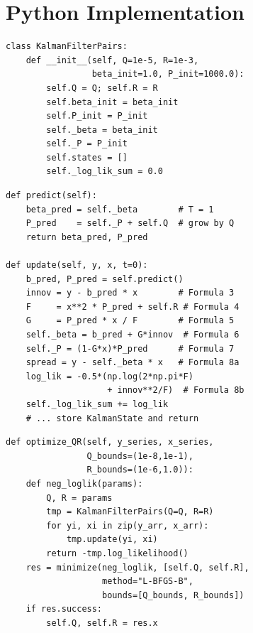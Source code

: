 \documentclass[10pt,a4paper,twocolumn]{article}
\begin{document}
\section{Python Implementation}

\begin{tcolorbox}[codebox={Constructor}]
\begin{lstlisting}[style=pythonplain]
class KalmanFilterPairs:
    def __init__(self, Q=1e-5, R=1e-3,
                 beta_init=1.0, P_init=1000.0):
        self.Q = Q; self.R = R
        self.beta_init = beta_init
        self.P_init = P_init
        self._beta = beta_init
        self._P = P_init
        self.states = []
        self._log_lik_sum = 0.0
\end{lstlisting}
\end{tcolorbox}

\begin{tcolorbox}[codebox={predict() and update()}]
\begin{lstlisting}[style=pythonplain]
def predict(self):
    beta_pred = self._beta        # T = 1
    P_pred    = self._P + self.Q  # grow by Q
    return beta_pred, P_pred

def update(self, y, x, t=0):
    b_pred, P_pred = self.predict()
    innov = y - b_pred * x        # Formula 3
    F     = x**2 * P_pred + self.R # Formula 4
    G     = P_pred * x / F        # Formula 5
    self._beta = b_pred + G*innov  # Formula 6
    self._P = (1-G*x)*P_pred      # Formula 7
    spread = y - self._beta * x   # Formula 8a
    log_lik = -0.5*(np.log(2*np.pi*F)
                    + innov**2/F)  # Formula 8b
    self._log_lik_sum += log_lik
    # ... store KalmanState and return
\end{lstlisting}
\end{tcolorbox}

\begin{tcolorbox}[codebox={optimize\_QR() via MLE}]
\begin{lstlisting}[style=pythonplain]
def optimize_QR(self, y_series, x_series,
                Q_bounds=(1e-8,1e-1),
                R_bounds=(1e-6,1.0)):
    def neg_loglik(params):
        Q, R = params
        tmp = KalmanFilterPairs(Q=Q, R=R)
        for yi, xi in zip(y_arr, x_arr):
            tmp.update(yi, xi)
        return -tmp.log_likelihood()
    res = minimize(neg_loglik, [self.Q, self.R],
                   method="L-BFGS-B",
                   bounds=[Q_bounds, R_bounds])
    if res.success:
        self.Q, self.R = res.x
\end{lstlisting}
\end{tcolorbox}
\end{document}
